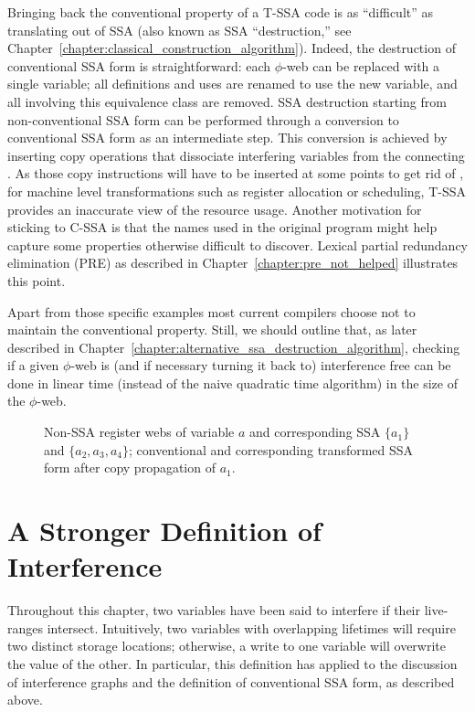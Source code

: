 Bringing back the conventional property of a T-SSA code is as ``difficult'' as translating out of SSA (also known as SSA ``destruction,'' see Chapter~\ref{chapter:classical_construction_algorithm}). 
Indeed, the destruction of conventional SSA form is straightforward:  each $\phi$-web can be replaced with a single variable; 
all definitions and uses are renamed to use the new variable, and all \phifuns involving this equivalence class are removed. 
SSA destruction starting from non-conventional SSA form can be performed through a conversion to conventional SSA form as an intermediate step. 
This conversion is achieved by inserting copy operations that dissociate interfering variables from the connecting \phifuns. 
As those copy instructions will have to be inserted at some points to get rid of \phifuns, for machine level transformations such as register allocation or scheduling, T-SSA provides an inaccurate view of the resource usage. 
Another motivation for sticking to C-SSA is that the names used in the original program might help capture some properties otherwise difficult to discover. 
Lexical partial redundancy elimination (PRE) as described in Chapter~\ref{chapter:pre_not_helped} illustrates this point.

Apart from those specific examples most current compilers choose not to maintain the conventional property. 
Still, we should outline that, as later described in Chapter~\ref{chapter:alternative_ssa_destruction_algorithm}, checking if a given $\phi$-web is (and if necessary turning it back to) interference free can be done in linear time (instead of the naive quadratic time algorithm) in the size of the $\phi$-web.

\begin{figure}[h]
\caption{\protect{} Non-SSA register webs of variable $a$ and
\protect{} corresponding SSA \phiwebs $\{a_1\}$ and $\{a_2,a_3,a_4\}$; 
\protect{} conventional and 
\protect{} corresponding transformed SSA form after copy propagation of $a_1$.}
\label{fig:properties_and_flavors:conventional}
\end{figure}



\section{A Stronger Definition of Interference}
\label{sec:properties_and_flavors:ultimate_interference}
Throughout this chapter, two variables have been said to interfere if their live-ranges intersect. 
Intuitively, two variables with overlapping lifetimes will require two distinct storage locations; 
otherwise, a write to one variable will overwrite the value of the other. 
In particular, this definition has applied to the discussion of interference graphs and the definition of conventional SSA form, as described above.

